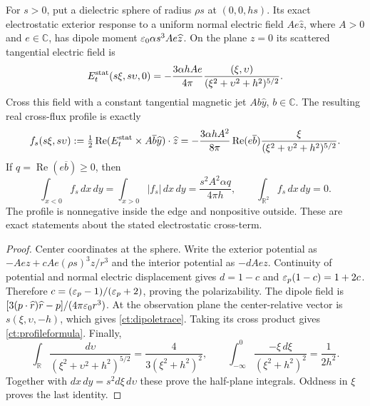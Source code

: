 \begin{lemma}
\label{ct:profile}
For $s>0$, put a dielectric sphere of radius $\rho s$ at
$(0,0,hs)$. Its exact electrostatic exterior response to a uniform
normal electric field $A e\widehat z$, where $A>0$ and $e\in\mathbb C$,
has dipole moment $\varepsilon_0\alpha s^3 A e\widehat z$.
On the plane $z=0$ its scattered tangential electric field is
\begin{equation}\label{ct:dipoletrace}
 E^{\rm stat}_t(s\xi,s\upsilon,0)
 =-\frac{3\alpha h A e}{4\pi}
       \frac{(\xi,\upsilon)}{(\xi^2+\upsilon^2+h^2)^{5/2}}.
\end{equation}
Cross this field with a constant tangential magnetic jet
$A b\widehat y$, $b\in\mathbb C$. The resulting real cross-flux
profile is exactly
\begin{equation}\label{ct:profileformula}
 f_s(s\xi,s\upsilon)
 :=\tfrac12\operatorname{Re}
    (E^{\rm stat}_t\times A\overline b\widehat y)\cdot\widehat z
 =-\frac{3\alpha h A^2}{8\pi}\operatorname{Re}(e\overline b)
       \frac{\xi}{(\xi^2+\upsilon^2+h^2)^{5/2}}.
\end{equation}
If $q=\operatorname{Re}(e\overline b)\geq0$, then
\begin{equation}\label{ct:profileintegrals}
 \int_{x<0}f_s\,dx\,dy
 =\int_{x>0}|f_s|\,dx\,dy
 =\frac{s^2 A^2\alpha q}{4\pi h},\qquad
 \int_{\mathbb R^2}f_s\,dx\,dy=0.
\end{equation}
The profile is nonnegative inside the edge and nonpositive outside.
These are exact statements about the stated electrostatic cross-term.
\end{lemma}
\begin{proof}
Center coordinates at the sphere. Write the exterior potential as
$-Ae z+cAe(\rho s)^3z/r^3$ and the interior potential as $-dAe z$.
Continuity of potential and normal electric displacement gives
$d=1-c$ and $\varepsilon_p(1-c)=1+2c$. Therefore
$c=(\varepsilon_p-1)/(\varepsilon_p+2)$, proving the polarizability.
The dipole field is
$[3(p\cdot\widehat r)\widehat r-p]/(4\pi\varepsilon_0 r^3)$.
At the observation plane the center-relative vector is
$s(\xi,\upsilon,-h)$, which gives \eqref{ct:dipoletrace}.
Taking its cross product gives \eqref{ct:profileformula}.
Finally,
\[
 \int_{\mathbb R}\frac{d\upsilon}
 { (\xi^2+\upsilon^2+h^2)^{5/2}}
 =\frac{4}{3(\xi^2+h^2)^2},\qquad
 \int_{-\infty}^0\frac{-\xi\,d\xi}{(\xi^2+h^2)^2}
 =\frac1{2h^2}.
\]
Together with $dx\,dy=s^2d\xi\,d\upsilon$ these prove the
half-plane integrals. Oddness in $\xi$ proves the last identity.
\end{proof}

